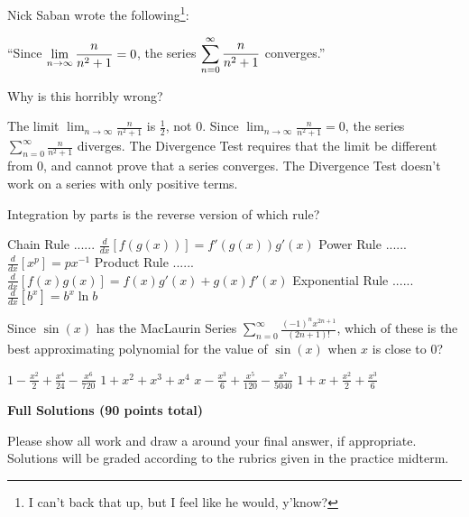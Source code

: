 \documentclass[12pt]{exam}
\newcommand{\ds}{\ensuremath{\displaystyle}}
\begin{document}
\begin{questions}

\setcounter{question}{0}
\question[3]
Nick Saban wrote the following\footnote{
  I can't back that up, but I feel like he would, y'know?
}:

\begin{center}
``Since $\ds\lim_{n\to\infty} \frac{n}{n^2+1} = 0$, the series
$\ds\sum_{n=0}^\infty \frac{n}{n^2+1}$ converges.''
\end{center}

Why is this horribly wrong?

\begin{checkboxes}
\choice The limit $\lim_{n\to\infty} \frac{n}{n^2+1}$ is
        $\frac{1}{2}$, not $0$.
\choice Since $\lim_{n\to\infty} \frac{n}{n^2+1} = 0$, the series
        $\sum_{n=0}^\infty \frac{n}{n^2+1}$ diverges.
\choice The Divergence Test requires that the limit be different from $0$, and
        cannot prove that a series converges.
\choice The Divergence Test doesn't work on a series with only positive terms.
\end{checkboxes}

\vfill

\question[3]
Integration by parts is the reverse version of which rule?

\begin{checkboxes}
\choice Chain Rule ...... $\frac{d}{dx}[f(g(x))]=f'(g(x))g'(x)$
\choice Power Rule ...... $\frac{d}{dx}[x^p]=px^{-1}$
\choice Product Rule ...... $\frac{d}{dx}[f(x)g(x)]=f(x)g'(x)+g(x)f'(x)$
\choice Exponential Rule ...... $\frac{d}{dx}[b^x]=b^x\ln b$
\end{checkboxes}

\vfill

\question[4]
Since $\sin(x)$ has the MacLaurin Series
$\sum_{n=0}^\infty \frac{(-1)^nx^{2n+1}}{(2n+1)!}$,
which of these is the best approximating polynomial for the value of
$\sin(x)$ when $x$ is close to $0$?

\begin{checkboxes}
\choice $1-\frac{x^2}{2}+\frac{x^4}{24}-\frac{x^6}{720}$
\choice $1+x^2+x^3+x^4$
\choice $x-\frac{x^3}{6}+\frac{x^5}{120}-\frac{x^7}{5040}$
\choice $1+x+\frac{x^2}{2}+\frac{x^3}{6}$
\end{checkboxes}

\vfill

\end{questions}

\newpage

\begin{center}
  \textbf{Full Solutions (90 points total)}
\end{center}
\noindent
Please show all work and draw a  around your final answer,
if appropriate. Solutions will be graded according to the rubrics given in
the practice midterm.
\end{document}
